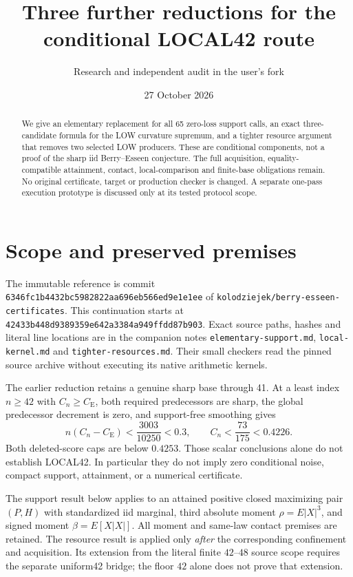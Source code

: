\documentclass[11pt]{article}
\title{Three further reductions for the conditional LOCAL42 route}
\author{Research and independent audit in the user's fork}
\date{27 October 2026}
\newcommand{\CE}{C_{\mathrm E}}
\begin{document}
\maketitle
\begin{abstract}
We give an elementary replacement for all 65 zero-loss support calls, an
exact three-candidate formula for the LOW curvature supremum, and a tighter
resource argument that removes two selected LOW producers. These are
conditional components, not a proof of the sharp iid Berry--Esseen
conjecture. The full acquisition, equality-compatible attainment, contact,
local-comparison and finite-base obligations remain. No original certificate,
target or production checker is changed. A separate one-pass execution
prototype is discussed only at its tested protocol scope.
\end{abstract}

\section{Scope and preserved premises}
The immutable reference is commit
\texttt{6346fc1b4432bc5982822aa696eb566ed9e1e1ee} of
\texttt{kolodziejek/berry-esseen-certificates}. This continuation starts at
\texttt{42433b448d9389359e642a3384a949ffdd87b903}. Exact source paths, hashes
and literal line locations are in the companion notes
\texttt{elementary-support.md}, \texttt{local-kernel.md} and
\texttt{tighter-resources.md}. Their small checkers read the pinned source
archive without executing its native arithmetic kernels.

The earlier reduction retains a genuine sharp base through 41. At a least
index $n\ge42$ with $C_n\ge\CE$, both required predecessors are sharp,
the global predecessor decrement is zero, and support-free smoothing gives
\[
 n(C_n-\CE)<\frac{3003}{10250}<0.3,\qquad
 C_n<\frac{73}{175}<0.4226.
\]
Both deleted-score caps are below $0.4253$. Those scalar conclusions alone
do not establish LOCAL42. In particular they do not imply zero conditional
noise, compact support, attainment, or a numerical certificate.

The support result below applies to an attained positive closed maximizing
pair $(P,H)$ with standardized iid marginal, third absolute moment
$\rho=E|X|^3$, and signed moment $\beta=E[X|X|]$. All moment and same-law
contact premises are retained. The resource result is applied only
\emph{after} the corresponding confinement and acquisition. Its extension
from the literal finite $42$--$48$ source scope requires the separate
uniform42 bridge; the floor $42$ alone does not prove that extension.
\end{document}
